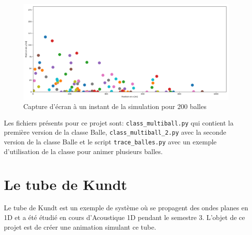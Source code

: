 \documentclass[a4paper, 11pt]{article}
\begin{document}
\begin{figure}[H]
	\centering
	\includegraphics[width=\linewidth]{Figures/multiball.png}
	\caption{Capture d'écran à un instant de la simulation pour 200 balles}
	\label{fig:multiball} 
\end{figure}

Les fichiers présents pour ce projet sont: \verb|class_multiball.py| qui contient la première version de la classe Balle, \verb|class_multiball_2.py| avec la seconde version de la classe Balle et le script \verb|trace_balles.py| avec un exemple d'utilisation de la classe pour animer plusieurs balles.





\newpage
\section{Le tube de Kundt}

Le tube de Kundt est un exemple de système où se propagent des ondes planes en 1D et a été étudié en cours d'Acoustique 1D pendant le semestre 3. L'objet de ce projet est de créer une animation simulant ce tube. 
\end{document}
